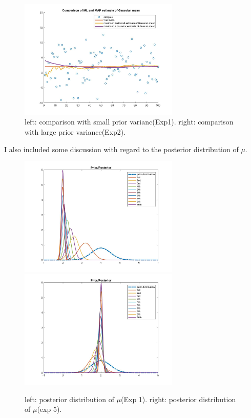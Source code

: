 \documentclass[a4paper]{article}
\begin{document}
\begin{spacing}{2.0}
\begin{itemize}
\begin{figure}[H]
	\includegraphics[width=3in]{100comparison2.jpg}
	\caption{left: comparison with small prior varianc(Exp1). right: comparison with large prior variance(Exp2).}
	\label{fig:side:b}
\end{figure}


I also included some discussion with regard to the posterior distribution of $\mu$.
\begin{figure}[H]
	\centering
	\includegraphics[width=3in]{posterior1.jpg}
	\includegraphics[width=3in]{posterior5.jpg}
	\caption{left: posterior distribution of $\mu$(Exp 1). right: posterior distribution of $\mu$(exp 5).}
	\label{fig:side:b}
\end{figure}


\end{itemize}
\end{spacing}
\end{document}
